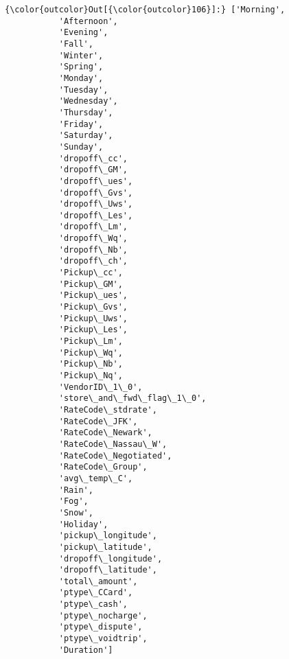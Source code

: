 \documentclass[11pt]{article}
\begin{document}
\begin{Verbatim}[commandchars=\\\{\}]
{\color{outcolor}Out[{\color{outcolor}106}]:} ['Morning',
           'Afternoon',
           'Evening',
           'Fall',
           'Winter',
           'Spring',
           'Monday',
           'Tuesday',
           'Wednesday',
           'Thursday',
           'Friday',
           'Saturday',
           'Sunday',
           'dropoff\_cc',
           'dropoff\_GM',
           'dropoff\_ues',
           'dropoff\_Gvs',
           'dropoff\_Uws',
           'dropoff\_Les',
           'dropoff\_Lm',
           'dropoff\_Wq',
           'dropoff\_Nb',
           'dropoff\_ch',
           'Pickup\_cc',
           'Pickup\_GM',
           'Pickup\_ues',
           'Pickup\_Gvs',
           'Pickup\_Uws',
           'Pickup\_Les',
           'Pickup\_Lm',
           'Pickup\_Wq',
           'Pickup\_Nb',
           'Pickup\_Nq',
           'VendorID\_1\_0',
           'store\_and\_fwd\_flag\_1\_0',
           'RateCode\_stdrate',
           'RateCode\_JFK',
           'RateCode\_Newark',
           'RateCode\_Nassau\_W',
           'RateCode\_Negotiated',
           'RateCode\_Group',
           'avg\_temp\_C',
           'Rain',
           'Fog',
           'Snow',
           'Holiday',
           'pickup\_longitude',
           'pickup\_latitude',
           'dropoff\_longitude',
           'dropoff\_latitude',
           'total\_amount',
           'ptype\_CCard',
           'ptype\_cash',
           'ptype\_nocharge',
           'ptype\_dispute',
           'ptype\_voidtrip',
           'Duration']
\end{Verbatim}
            
\end{document}
